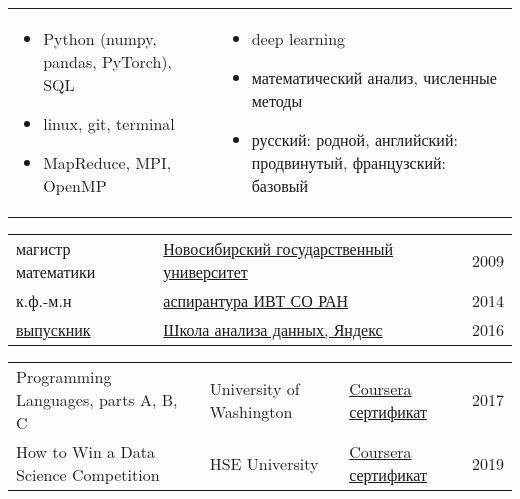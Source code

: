 \documentclass[11pt]{article}
\begin{document}
\begin{longtable} {p{}p{}}
\vspace{-2.0em}
\begin{itemize}
	\item Python (numpy, pandas, PyTorch), SQL
	\item linux, git, terminal
	\item MapReduce, MPI, OpenMP
\end{itemize}
&
\vspace{-2.0em}
\begin{itemize}
	\item deep learning
	\item математический анализ, численные методы
	\item русский: родной, английский: продвинутый, французский: базовый
\end{itemize}
\\
\end{longtable}

\vspace{-2.5em}

\begin{longtable} {p{}p{}l}
  магистр математики & \href{https://www.nsu.ru/}{Новосибирский государственный университет} & 2009 \vspace{0.5em} \\
	к.ф.-м.н & \href{http://www.ict.nsc.ru/ru/education/postgraduate}{аспирантура ИВТ СО РАН} & 2014 \vspace{0.5em}\\
  \href{https://academy.yandex.ru/dataschool/graduates}{выпускник} & \href{https://yandexdataschool.ru}{Школа анализа данных, Яндекс} & 2016 \vspace{0.5em}\\
\end{longtable}

\vspace{-1.0em}

\vspace{-0.5em}
\begin{longtable} {p{}p{}ll}
	Programming Languages, parts A, B, C &
	University of Washington & \href{https://coursera.org/share/3e187e640ed6df57b0a84ecb8a82ddab}{Coursera сертификат} & 2017 \vspace{0.5em}\\
	How to Win a Data Science Competition & HSE University & \href{https://coursera.org/share/0ad3f02a08a405800c29d5909caece90}{Coursera сертификат} & 2019   \vspace{0.5em}\\
\end{longtable}

\vspace{-1.0em}


\end{document}
